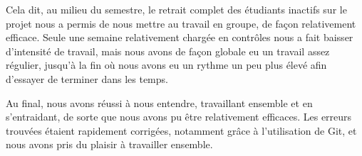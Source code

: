 Cela dit, au milieu du semestre, le retrait complet des étudiants inactifs sur le projet nous a permis de nous mettre au travail en groupe, de façon relativement efficace. Seule une semaine relativement chargée en contrôles nous a fait baisser d'intensité de travail, mais nous avons de façon globale eu un travail assez régulier, jusqu'à la fin où nous avons eu un rythme un peu plus élevé afin d'essayer de terminer dans les temps.

Au final, nous avons réussi à nous entendre, travaillant ensemble et en s'entraidant, de sorte que nous avons pu être relativement efficaces. Les erreurs trouvées étaient rapidement corrigées, notamment grâce à l'utilisation de Git, et nous avons pris du plaisir à travailler ensemble.
